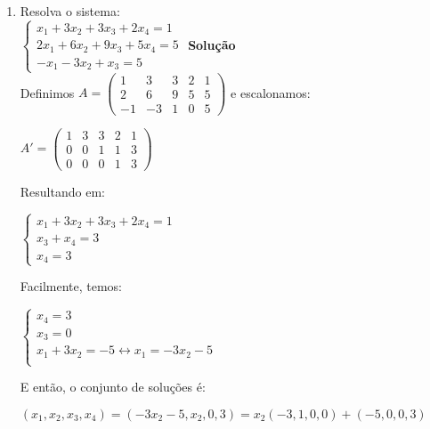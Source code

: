 \documentclass[12pt]{article}
\begin{document}
\begin{enumerate}
	\item Resolva o sistema:\\[10pt]
		$\begin{cases}
			x_1 + 3x_2 + 3x_3 + 2x_4 = 1 \\
			2x_1 + 6x_2 + 9x_3 + 5x_4 = 5 \\
			-x_1 - 3x_2 + x_3 = 5 		
		\end{cases}$\newpage
		\textbf{Solução\\[10pt]}
		Definimos $A = \begin{pmatrix}
		1 & 3 & 3 & 2 & 1\\ 2 & 6 & 9 & 5 & 5 \\  -1 & -3 & 1 & 0 & 5
		\end{pmatrix}$ e escalonamos:
		\begin{center}
			$A' =
			\begin{pmatrix}
				1 & 3 & 3 & 2 & 1\\ 0 & 0 & 1 & 1 & 3 \\  0 & 0 & 0 & 1 & 3
			\end{pmatrix}$
		\end{center}
		Resultando em:
		\begin{center}
			$\begin{cases}
			x_1 + 3x_2 + 3x_3 + 2x_4 = 1\\
			x_3 + x_4 = 3\\
			x_4 = 3
			\end{cases}$
		\end{center}
		Facilmente, temos:
		\begin{center}
			$\begin{cases}
			x_4 = 3\\
			x_3 = 0 \\
			x_1 + 3x_2 = -5 \leftrightarrow x_1 = - 3x_2 - 5\\
			\end{cases}$
		\end{center}
		E então, o conjunto de soluções é:
		\begin{center}
			$
			(x_1,x_2,x_3,x_4) =  (-3x_2 - 5, x_2, 0, 3) = x_2(-3,1,0,0) + (-5,0,0,3)
			$
		\end{center}
		

\end{enumerate}
\end{document}
